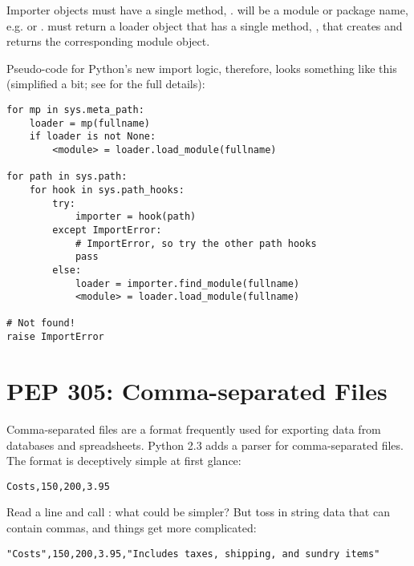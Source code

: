 \documentclass{howto}
\begin{document}
Importer objects must have a single method,
.  
will be a module or package name, e.g.  or
.   must return a loader object
that has a single method, , that
creates and returns the corresponding module object.

Pseudo-code for Python's new import logic, therefore, looks something
like this (simplified a bit; see  for the full details):

\begin{verbatim}
for mp in sys.meta_path:
    loader = mp(fullname)
    if loader is not None:
        <module> = loader.load_module(fullname)
        
for path in sys.path:
    for hook in sys.path_hooks:
        try:
            importer = hook(path)
        except ImportError:
            # ImportError, so try the other path hooks
            pass
        else:
            loader = importer.find_module(fullname)
            <module> = loader.load_module(fullname)

# Not found!
raise ImportError
\end{verbatim}

\begin{seealso}


\end{seealso}


\section{PEP 305: Comma-separated Files \label{section-pep305}}

Comma-separated files are a format frequently used for exporting data
from databases and spreadsheets.  Python 2.3 adds a parser for
comma-separated files.
The format is deceptively simple at first glance:

\begin{verbatim}
Costs,150,200,3.95
\end{verbatim}

Read a line and call : what could be simpler?
But toss in string data that can contain commas, and things get more
complicated:

\begin{verbatim}
"Costs",150,200,3.95,"Includes taxes, shipping, and sundry items"
\end{verbatim}
\end{document}
